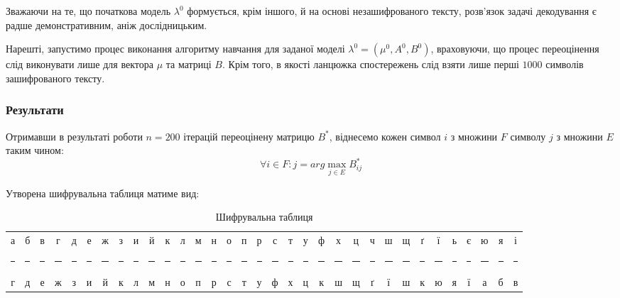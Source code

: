 Зважаючи на те, що початкова модель $\lambda^0$ формується, крім іншого, й на основі незашифрованого тексту, розв'язок задачі декодування є радше демонстративним, аніж дослідницьким. 

Нарешті, запустимо процес виконання алгоритму навчання для заданої моделі $\lambda^0=(\mu^0,A^0,B^0)$, враховуючи, що процес переоцінення слід виконувати лише для вектора $\mu$ та матриці $B$. Крім того, в якості ланцюжка спостережень слід взяти лише перші $1000$ символів зашифрованого тексту.

\subsubsection*{Результати}

Отримавши в результаті роботи $n=200$ ітерацій переоцінену матрицю $B^*$, віднесемо кожен символ $i$ з множини $F$ символу $j$ з множини $E$ таким чином: 
\[ \forall i\in F: j=arg\max\limits_{j\in E} B^*_{ij} \]

Утворена шифрувальна таблиця матиме вид:
\vspace{0.4cm}
\begin{table}[H]
    \setlength{\tabcolsep}{3.3pt}
    \renewcommand{\arraystretch}{0.5}
    \begin{center}
        \begin{tabular}{ccccccccccccccccccccccccccccccccc}
            а&б&в&г&д&е&ж&з&и&й&к&л&м&н&о&п&р&с&т&у&ф&х&ц&ч&ш&щ&ґ&ї&ь&є&ю&я&і \\
\rule[0pt]{0.8pt}{4pt} & \rule[0pt]{0.8pt}{4pt} & \rule[0pt]{0.8pt}{4pt} & \rule[0pt]{0.8pt}{4pt} & 
\rule[0pt]{0.8pt}{4pt} & \rule[0pt]{0.8pt}{4pt} & \rule[0pt]{0.8pt}{4pt} & \rule[0pt]{0.8pt}{4pt} & 
\rule[0pt]{0.8pt}{4pt} & \rule[0pt]{0.8pt}{4pt} & \rule[0pt]{0.8pt}{4pt} & \rule[0pt]{0.8pt}{4pt} & 
\rule[0pt]{0.8pt}{4pt} & \rule[0pt]{0.8pt}{4pt} & \rule[0pt]{0.8pt}{4pt} & \rule[0pt]{0.8pt}{4pt} &
\rule[0pt]{0.8pt}{4pt} & \rule[0pt]{0.8pt}{4pt} & \rule[0pt]{0.8pt}{4pt} & \rule[0pt]{0.8pt}{4pt} &
\rule[0pt]{0.8pt}{4pt} & \rule[0pt]{0.8pt}{4pt} & \rule[0pt]{0.8pt}{4pt} & \rule[0pt]{0.8pt}{4pt} &
\rule[0pt]{0.8pt}{4pt} & \rule[0pt]{0.8pt}{4pt} & \rule[0pt]{0.8pt}{4pt} & \rule[0pt]{0.8pt}{4pt} &
\rule[0pt]{0.8pt}{4pt} & \rule[0pt]{0.8pt}{4pt} & \rule[0pt]{0.8pt}{4pt} & \rule[0pt]{0.8pt}{4pt} &
\rule[0pt]{0.8pt}{4pt} \\
            г&д&е&ж&з&и&й&к&л&м&н&о&п&р&с&т&у&ф&х&ц&{\color{blue}к}&ш&щ&ґ&ї&{\color{blue}ш}&{\color{blue}к}&ю&я&{\color{blue}ї}&а&б&в \\
        \end{tabular}
    \end{center}
    \caption{Шифрувальна таблиця}
\end{table}


